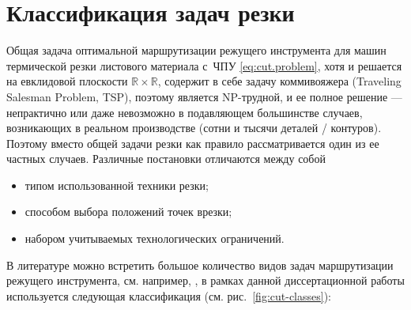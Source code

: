
\section{Классификация задач резки}
\label{sec:cut.class}

Общая задача оптимальной маршрутизации режущего
инструмента для машин термической резки листового материала с~ЧПУ
\eqref{eq:cut.problem},
хотя и решается на евклидовой плоскости
$\mathbb R \times \mathbb R$,
содержит в себе задачу коммивояжера
(Traveling Salesman Problem, TSP),
поэтому является NP-трудной,
и ее полное решение --- непрактично
или даже невозможно в подавляющем большинстве случаев,
возникающих в реальном производстве
(сотни и тысячи деталей / контуров).
Поэтому вместо общей задачи резки
как правило рассматривается один из ее частных случаев.
Различные постановки отличаются между собой
\begin{itemize}
  \item типом использованной техники резки;
  \item способом выбора положений точек врезки;
  \item набором учитываемых технологических ограничений.
\end{itemize}

В литературе можно встретить большое количество
видов задач маршрутизации режущего инструмента,
см. например,
\cite{bi:Hoeft1997,bi:dewil-review,bi:Stylios},
в рамках данной диссертационной работы
используется следующая классификация
(см. рис.~\ref{fig:cut-classes}):

